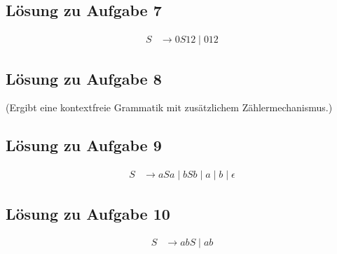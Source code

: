 \documentclass[a4paper,12pt]{article}
\begin{document}
	\subsection*{Lösung zu Aufgabe 7}
	\begin{align*}
		S &\rightarrow 0 S 1 2 \mid 012
	\end{align*}
	
	\subsection*{Lösung zu Aufgabe 8}
	(Ergibt eine kontextfreie Grammatik mit zusätzlichem Zählermechanismus.)
	
	\subsection*{Lösung zu Aufgabe 9}
	\begin{align*}
		S &\rightarrow a S a \mid b S b \mid a \mid b \mid \epsilon
	\end{align*}
	
	\subsection*{Lösung zu Aufgabe 10}
	\begin{align*}
		S &\rightarrow ab S \mid ab
	\end{align*}
	
\end{document}
